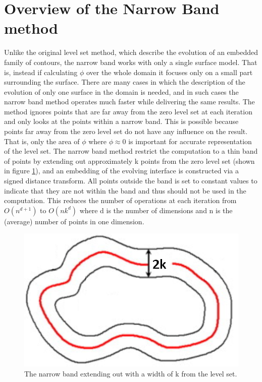 \section{Overview of the Narrow Band method}
Unlike the original level set method, which describe the evolution of an embedded family of contours, the narrow band works with only a single surface model\cite{whitaker89}. That is, instead if calculating $\phi$ over the whole domain it focuses only on a small part surrounding the surface. There are many cases in which the description of the evolution of only one surface in the domain is needed, and in such cases the narrow band method operates much faster while delivering the same results. The method ignores points that are far away from the zero level set at each iteration and only looks at the points within a narrow band. This is possible because points far away from the zero level set do not have any influence on the result. That is, only the area of \(\phi\) where \(\phi \approx 0\) is important for accurate representation of the level set. The narrow band method restrict the computation to a thin band of points by extending out approximately k points from the zero level set (shown in figure \ref{narrowBand}), and an embedding of the evolving interface is constructed via a signed distance transform. All points outside the band is set to constant values to indicate that they are not within the band and thus should not be used in the computation. This reduces the number of operations at each iteration from \(O(n^{d+1})\) to \(O(nk^{d})\) \cite{adalsteinsson94} where d is the number of dimensions and n is the (average) number of points in one dimension. 
\begin{figure}[h!]
\centering
\includegraphics[width=.5\textwidth]{levelset/narrowBand}
\caption{The narrow band extending out with a width of k from the level set.}
\label{narrowBand}
\end{figure}
